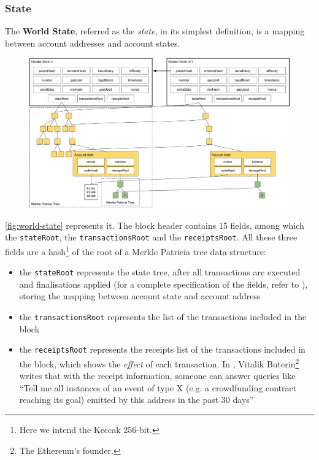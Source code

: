 \subsubsection{State}

The \textbf{World State}, referred as the \emph{state}, in its simplest
definition, is a mapping between account addresses and account states.

\begin{figure}[h]
  \centering
  \includegraphics[width=\textwidth]{./res/img/world-state.pdf}
\label{fig:world-state}
\end{figure}

\autoref{fig:world-state} represents it. The block header contains 15 fields,
among which the \verb+stateRoot+, the \verb+transactionsRoot+ and the
\verb+receiptsRoot+. All these three fields are a hash\footnote{Here we intend
the Keccak 256-bit.} of the root of a Merkle Patricia tree data structure:

\begin{itemize}
  \item the \verb+stateRoot+ represents the state tree, after all transactions
  are executed and finalisations applied (for a complete specification of the
  fields, refer to \cite{wood2018ethereum}), storing the mapping between account
  state and account address
  \item the \verb+transactionsRoot+ represents the list of the transactions included in
  the block
  \item the \verb+receiptsRoot+ represents the receipts list of the transactions
  included in the block, which shows the \emph{effect} of each transaction. In
  \cite{merklingethereum}, Vitalik Buterin\footnote{The Ethereum's founder.}
  writes that with the receipt information, someone can answer queries like
  ``Tell me all instances of an event of type X (e.g. a crowdfunding contract
  reaching its goal) emitted by this address in the past 30 days''
\end{itemize}

